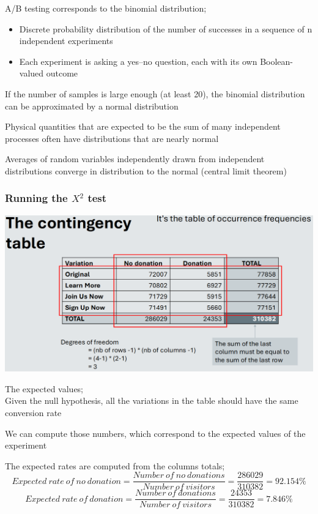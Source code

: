 \documentclass[]{project_plan}
\begin{document}
A/B testing corresponds to the binomial distribution;
\begin{itemize}
  \item Discrete probability distribution of the
        number of successes in a sequence of n
        independent experiments
  \item Each experiment is asking a yes–no question,
        each with its own Boolean-valued outcome
\end{itemize}

If the number of samples is large enough (at
least 20), the binomial distribution can be
approximated by a normal distribution

Physical quantities that are expected to be
the sum of many independent processes
often have distributions that are nearly
normal

Averages of random variables independently
drawn from independent
distributions converge in distribution to the
normal (central limit theorem)

\newpage

\subsubsection{Running the $X^2$ test}

\includegraphics[width=\linewidth]{The_contingency_table.png}

The expected values;\\
Given the null hypothesis, all the variations in
the table should have the same conversion
rate

We can compute those numbers, which
correspond to the expected values of the
experiment

The expected rates are computed from the columns totals;
\begin{displaymath}
  Expected\ rate\ of\ no\ donation = \dfrac{Number\ of\ no\ donations}{Number\ of\ visitors} = \dfrac{286029}{310382} = 92.154\%
\end{displaymath}
\begin{displaymath}
  Expected\ rate\ of\ donation = \frac{Number\ of\ donations}{Number\ of\ visitors} = \frac{24353}{310382} = 7.846\%
\end{displaymath}
\end{document}
